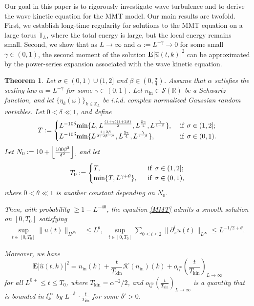 \documentclass[UTF-8,reqno]{amsart}
\numberwithin{equation}{section}
\newtheorem{theorem}{Theorem}[section]
\theoremstyle{definition}
\def\min{{\mathord{{\rm min}}}}
\def\geq{\geqslant}
\def\leq{\leqslant}
\def\min{{\mathord{{\rm min}}}}
\def\geq{\geqslant}
\def\leq{\leqslant}
\begin{document}
Our goal in this paper is to rigorously investigate wave turbulence
and to derive the wave kinetic equation  for the MMT model. Our main results are twofold. 
First, we establish long-time regularity for solutions to the MMT equation
on a large torus $\mathbb{T}_L$,  where the total energy is large,
but the local energy remains small.  Second, we show that as $L \to \infty$ and $\alpha := L^{-\gamma} \to 0$
for some small $\gamma \in (0,1)$, the second moment of the solution
$\mathbf{E}|\widehat{u}(t,k)|^2$ can be approximated by the power-series
expansion associated with the wave kinetic equation.   
\begin{theorem} \label{thm1}
Let $\sigma \in (0,1)\cup(1,2]$ and $\beta \in \left(0,\frac{\sigma}{4}\right)$. 
Assume that $\alpha$ satisfies the scaling law $\alpha = L^{-\gamma}$ for some $\gamma \in (0,1)$. 
Let $n_{\mathrm{in}} \in \mathcal{S}(\mathbb{R})$ be a Schwartz function, and let 
$\{\eta_k(\omega)\}_{k\in\mathbb{Z}_L}$ be i.i.d. complex normalized Gaussian random variables. Let $0<\delta \ll 1$, and define
 \begin{align}\label{def:T}
 T:= \begin{cases}
      L^{-10\delta}\min\{L,L^{\frac{(1+\gamma)(1+2\beta)}{2}} ,L^{\frac{5\gamma}{4}},L^{\frac{\gamma}{1-\beta}}\},\ &{\rm if}\ \sigma\in(1,2]; \\
       L^{-10\delta}\min\{ L^{\frac{1+2\beta}{2+2\beta-\sigma}},L^{\frac{5\gamma}{4}},L^{\frac{\gamma}{1-\beta}}\},\ &{\rm if}\ \sigma\in(0,1).
 \end{cases}
 \end{align} 
Let  $N_0:= 10 + \Bigl\lfloor \frac{100\beta^2}{\delta^2} \Bigr\rfloor$, and let
\begin{align*}
    T_0:=\begin{cases}
        T,\ \ &{\rm if}\  \sigma\in  (1,2];\\
        \min\{T,  L^{\gamma+\theta}\},\ \ &{\rm if}\  \sigma\in (0,1),
    \end{cases}
\end{align*}
 where $0<\theta\ll1$ is another constant depending on $N_0$.  

Then, with probability $\geq 1 - L^{-40}$,   the equation \eqref{MMT} admits a smooth solution on $[0,T_0]$ satisfying
\begin{align*}
  \sup_{t\in[0,T_0]} \|u(t)\|_{H^{N_0}} &\leq L^{\theta},  \ \
  \sup_{t\in[0,T_0]} \sum_{0\leq i\leq 2} \|\partial_x^i u(t)\|_{L^\infty} \leq L^{-1/2+\theta}.
\end{align*}

 Moreover, we have 
\begin{equation}\label{app}
\mathbf E |\widehat u(t, k)|^2 =n_{\mathrm{in}}(k)+\frac{t}{T_{\mathrm{kin}}}\mathcal K(n_{\mathrm{in}})(k)
+o_{l^\infty_k}\left(\frac{t}{T_{\mathrm {kin}}}\right)_{L \to \infty}
\end{equation}
for all $L^{0+} \leq t \leq T_0$, where $T_{\mathrm{kin}}=\alpha^{-2}/2$, and $o_{l^\infty_k}\left(\frac{t}{T_{\mathrm {kin}}}\right)_{L \to \infty}$ is a quantity that is bounded in $l^\infty_k$ by $L^{-\delta'}\cdot \frac{t}{T_{\mathrm {kin}}}$ for some $\delta'>0$.

\end{theorem}
\end{document}
